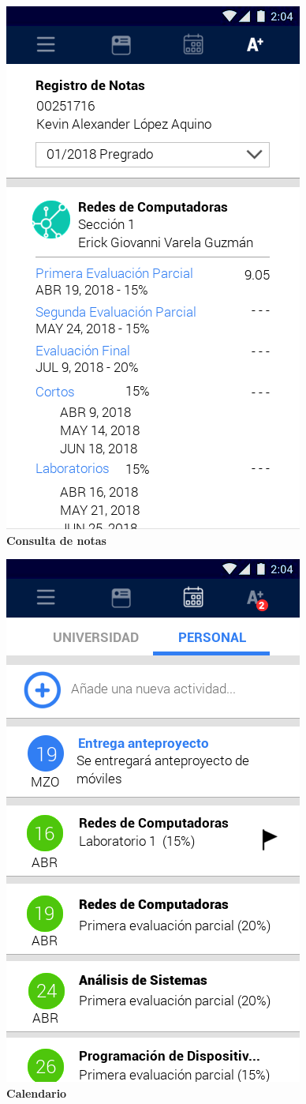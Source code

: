 \documentclass[12pt]{article}
\begin{document}
\begin{figure}[H]
	\caption{\textbf{Consulta de notas}}
	\label{fig:consultaNotas}
	\includegraphics[scale=0.50]{img/6.png}
	\centering
\end{figure}

\begin{figure}[H]
	\caption{\textbf{Calendario}}
	\label{fig:calendario}
	\includegraphics[scale=0.50]{img/4.png}
	\centering
\end{figure}
\end{document}
